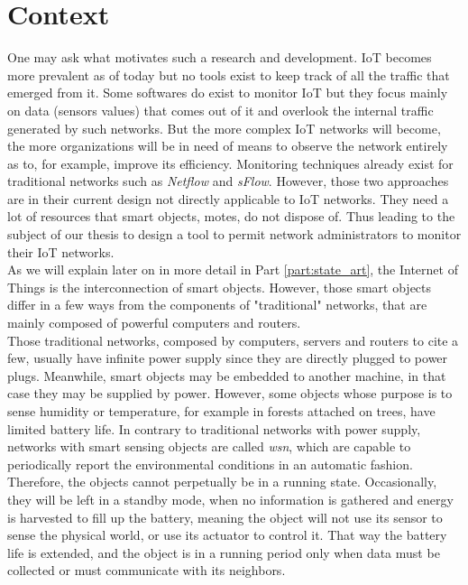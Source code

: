 \section*{Context}

One may ask what motivates such a research and development. IoT becomes more prevalent as of today but no tools exist to keep track of all the traffic that emerged from it. Some softwares do exist to monitor IoT but they focus mainly on data (sensors values) that comes out of it and overlook the internal traffic generated by such networks. But the more complex IoT networks will become, the more organizations will be in need of means to observe the network entirely as to, for example, improve its efficiency. Monitoring techniques already exist for traditional networks such as \textit{Netflow} and \textit{sFlow}. However, those two approaches are in their current design not directly applicable to IoT networks. They need a lot of resources that smart objects, motes, do not dispose of. Thus leading to the subject of our thesis to design a tool to permit network administrators to monitor their IoT networks.\\

As we will explain later on in more detail in Part \ref{part:state_art}, the Internet of Things is the interconnection of smart objects. However, those smart objects differ in a few ways from the components of "traditional" networks, that are mainly composed of powerful computers and routers.\\

Those traditional networks, composed by computers, servers and routers to cite a few, usually have infinite power supply since they are directly plugged to power plugs. Meanwhile, smart objects may be embedded to another machine, in that case they may be supplied by power. However, some objects whose purpose is to sense humidity or temperature, for example in forests attached on trees, have limited battery life. In contrary to traditional networks with power supply, networks with smart sensing objects are called \textit{\acrfull{wsn}}, which are capable to periodically report the environmental conditions in an automatic fashion. Therefore, the objects cannot perpetually be in a running state. Occasionally, they will be left in a standby mode, when no information is gathered and energy is harvested to fill up the battery, meaning the object will not use its sensor to sense the physical world, or use its actuator to control it. That way the battery life is extended, and the object is in a running period only when data must be collected or must communicate with its neighbors. \\

